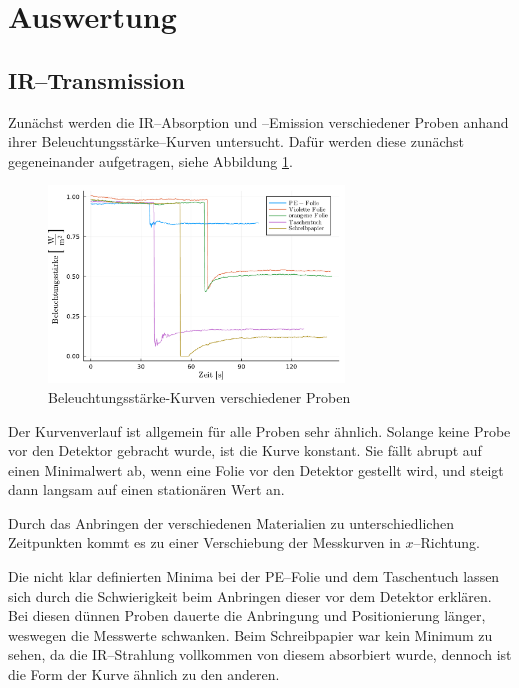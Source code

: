 \documentclass[12pt,a4paper]{scrartcl}
\numberwithin{equation}{section} %
\begin{document}
	\clearpage
	\hypertarget{auswertung}{%
		\section{Auswertung}\label{auswertung}}
	\subsection{IR--Transmission}
	\label{IR--Transmission}
	
	Zunächst werden die IR--Absorption und --Emission verschiedener Proben anhand ihrer Beleuchtungsstärke--Kurven untersucht. Dafür werden diese zunächst gegeneinander aufgetragen, siehe Abbildung \ref{abb:materialien}.
	
	\begin{figure}[h]
		\centering
		\includegraphics[width=0.7\textwidth]{../media/B1.1/materialien.pdf}
		\caption{Beleuchtungsstärke-Kurven verschiedener Proben}
		\label{abb:materialien}
	\end{figure}
	
	Der Kurvenverlauf ist allgemein für alle Proben sehr ähnlich. Solange keine Probe vor den Detektor gebracht wurde, ist die Kurve konstant. Sie fällt abrupt auf einen Minimalwert ab, wenn eine Folie vor den Detektor gestellt wird, und steigt dann langsam auf einen stationären Wert an.
	
	Durch das Anbringen der verschiedenen Materialien zu unterschiedlichen Zeitpunkten kommt es zu einer Verschiebung der Messkurven in $x$--Richtung.
	
	Die nicht klar definierten Minima bei der PE--Folie und dem Taschentuch lassen sich durch die Schwierigkeit beim Anbringen dieser vor dem Detektor erklären. Bei diesen dünnen Proben dauerte die Anbringung und Positionierung länger, weswegen die Messwerte schwanken. Beim Schreibpapier war kein Minimum zu sehen, da die IR--Strahlung vollkommen von diesem absorbiert wurde, dennoch ist die Form der Kurve ähnlich zu den anderen.
	
\end{document}
